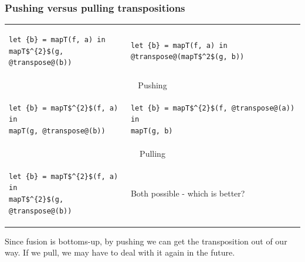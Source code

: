 \documentclass[rgb,dvipsnames]{beamer}
\begin{document}
\begin{frame}[fragile]
\frametitle{Pushing versus pulling transpositions}

\begin{tabular}{p{}p{}}
\scriptsize
\begin{lstlisting}[mathescape]
let {b} = mapT(f, a) in
mapT$^{2}$(g, @transpose@(b))
\end{lstlisting}
\vspace{-2ex}
&
\scriptsize
\begin{lstlisting}[mathescape]
let {b} = mapT(f, a) in
@transpose@(mapT$^2$(g, b))
\end{lstlisting}
\vspace{-2ex}
\\
\multicolumn{2}{c}{Pushing} \\
\scriptsize
\begin{lstlisting}[mathescape]
let {b} = mapT$^{2}$(f, a) in
mapT(g, @transpose@(b))
\end{lstlisting}
\vspace{-2ex}
&
\scriptsize
\begin{lstlisting}[mathescape]
let {b} = mapT$^{2}$(f, @transpose@(a)) in
mapT(g, b)
\end{lstlisting}
\vspace{-2ex}
\\
\multicolumn{2}{c}{Pulling} \\
\scriptsize
\begin{lstlisting}[mathescape]
let {b} = mapT$^{2}$(f, a) in
mapT$^{2}$(g, @transpose@(b))
\end{lstlisting}
\vspace{-2ex}
&
\large
\vspace{2ex}
Both possible - which is better?
\end{tabular}

Since fusion is bottoms-up, by pushing we can get the transposition
out of our way.  If we pull, we may have to deal with it again in the
future.
\end{frame}
\end{document}
